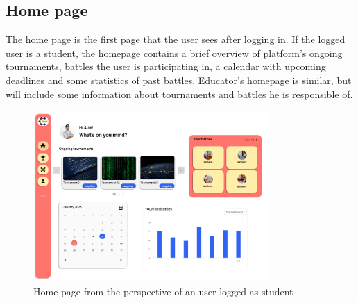 \subsection{Home page}
The home page is the first page that the user sees after logging in. If the logged user is a student, the homepage contains a brief overview of platform's ongoing tournaments, battles the user is participating in, a calendar with upcoming deadlines and some statistics of past battles. Educator's homepage is similar, but will include some information about tournaments and battles he is responsible of. \\
\begin{figure}[H]
    \centering
    \includegraphics[width=0.8\textwidth]{Mockups/3_student_homepage.png}
    \caption{Home page from the perspective of an user logged as student}
\end{figure}

